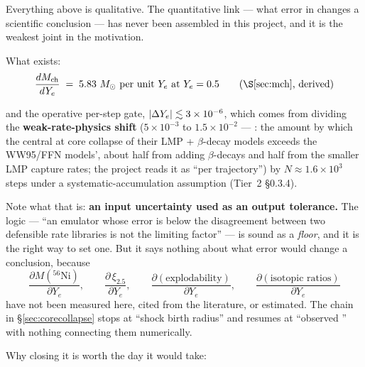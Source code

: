 Everything above is qualitative. The quantitative link --- what error in \Ye{}
changes a scientific conclusion --- has never been assembled in this project,
and it is the weakest joint in the motivation.

What exists:
%
\begin{equation}\label{eq:dmchdye-recall}
\frac{dM_{\mathrm{ch}}}{dY_e} \;=\; 5.83\ M_\odot \text{ per unit } Y_e \text{ at } Y_e = 0.5
\qquad\text{(\S\ref{sec:mch}, derived)}
\end{equation}

and the operative per-step gate, $|\Delta Y_{e}| \lesssim 3 \times 10^{-6}$, which
comes from dividing the \textbf{weak-rate-physics shift} ($5 \times 10^{-3}$ to
$1.5 \times 10^{-2}$ --- \citealt{heger2001}: the amount by which the central
\Ye{} at core collapse of their LMP + $\beta$-decay models exceeds the WW95/FFN
models', about half from adding $\beta$-decays and half from the smaller LMP
capture rates; the project reads it as ``per trajectory'') by $N \approx 1.6
\times 10^{3}$ steps under a systematic-accumulation assumption (Tier~2
\S 0.3.4).

Note what that is: \textbf{an input uncertainty used as an output tolerance.}
The logic --- ``an emulator whose error is below the disagreement between two
defensible rate libraries is not the limiting factor'' --- is sound as a
\emph{floor}, and it is the right way to set one. But it says nothing about
what error would change a conclusion, because
%
\begin{equation}\label{eq:missingderivs}
\frac{\partial M({}^{56}\mathrm{Ni})}{\partial Y_e},\qquad
\frac{\partial\,\xi_{2.5}}{\partial Y_e},\qquad
\frac{\partial(\text{explodability})}{\partial Y_e},\qquad
\frac{\partial(\text{isotopic ratios})}{\partial Y_e}
\end{equation}
%
have not been measured here, cited from the literature, or estimated. The chain
in \S\ref{sec:corecollapse} stops at ``shock birth radius'' and resumes at
``observed '' with nothing connecting them numerically.

Why closing it is worth the day it would take:

